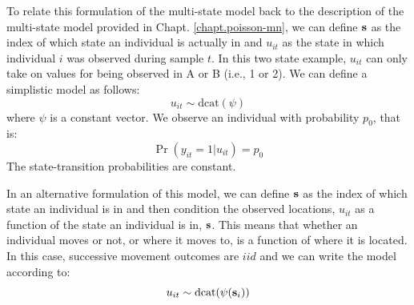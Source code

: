 To relate this formulation of the multi-state model
back to the description of the multi-state model
provided in Chapt. \ref{chapt.poisson-mn}, we can define ${\bf s}$
as the index of which state an individual is actually in 
and $u_{it}$ as
the state in which individual $i$ was observed during sample $t$.  In this two state example,
$u_{it}$ can only take on values for being observed in A or B (i.e., 1 or 2).
We can define a simplistic model as follows:
\[
u_{it} \sim  \mathrm{dcat}(\psi)
\]
where $\psi$ is a constant vector.
We observe an individual with probability $p_{0}$, that is:
\[
 \Pr(y_{it} = 1| u_{it} )  = p_{0}
\]
The state-transition probabilities are constant.

In an alternative formulation of this model, 
we can define ${\bf s}$
as the index of which state
an individual is in and then condition the observed locations, $u_{it}$
as a function of the state an individual is in, ${\bf s}$. This
means that whether an individual moves or not, or where it moves to, is a function of where it is located.
In this case, 
successive movement outcomes 
are $iid$ and we can write the model according to:
\[
u_{it} \sim  \text{dcat}( {\psi}({\bf s}_{i}) )
\]

